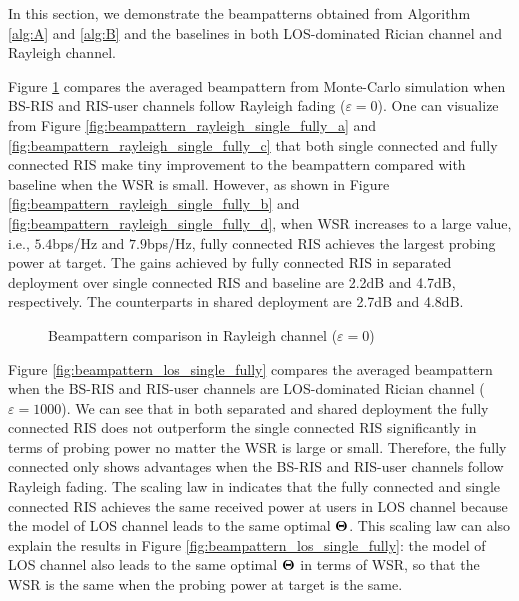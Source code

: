 In this section, we demonstrate the beampatterns obtained from Algorithm \ref{alg:A} and \ref{alg:B} 
and the baselines in both LOS-dominated Rician channel and Rayleigh channel.

Figure \ref{fig:beampattern_rayleigh_single_fully} compares the averaged beampattern from Monte-Carlo simulation when BS-RIS and RIS-user channels follow 
Rayleigh fading ($\varepsilon = 0$).
One can visualize from Figure \ref{fig:beampattern_rayleigh_single_fully_a} and \ref{fig:beampattern_rayleigh_single_fully_c} that both single connected and fully connected RIS make tiny improvement to the beampattern 
compared with baseline when the WSR is small. However, as shown in Figure \ref{fig:beampattern_rayleigh_single_fully_b} and \ref{fig:beampattern_rayleigh_single_fully_d}, when WSR increases to a large value, i.e., $5.4$bps/Hz and $7.9$bps/Hz, fully connected 
RIS achieves the largest probing power at target. The gains achieved by fully connected RIS in separated deployment 
over single connected RIS and baseline are 2.2dB and 4.7dB, respectively. The counterparts in shared deployment are 2.7dB and 4.8dB.

\begin{figure}[ht]
    \centering

    \caption{Beampattern comparison in Rayleigh channel ($\varepsilon = 0$)}
    \label{fig:beampattern_rayleigh_single_fully}
\end{figure}

Figure \ref{fig:beampattern_los_single_fully} compares the averaged beampattern when the BS-RIS and RIS-user channels are LOS-dominated  Rician channel ($\varepsilon = 1000$). 
We can see that in both separated and shared deployment the fully connected RIS does not outperform the single connected RIS significantly in terms of probing power no matter the 
WSR is large or small. Therefore, the fully connected only shows advantages when the BS-RIS and RIS-user channels follow Rayleigh fading.
The scaling law in \cite{shen2020modeling} indicates that the fully connected and single connected RIS achieves the same 
received power at users in LOS channel because the model of LOS channel leads to the same optimal ${\bf \Theta}$. This scaling law
can also explain the results in Figure \ref{fig:beampattern_los_single_fully}: the model of LOS channel also leads to the same optimal ${\bf \Theta}$ in terms of WSR, 
so that the WSR is the same when the probing power at target is the same. 


